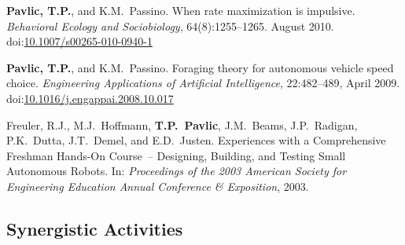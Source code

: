 \documentclass[svgnames,11pt]{article}
\newcommand\doilink[1]{\href{http://dx.doi.org/#1}{#1}}
\newcommand\doi[1]{doi:\doilink{#1}}
\begin{document}
\begin{bibenum}[itemsep=5pt]
    \item \textbf{Pavlic, T.P.}, and K.M.~Passino. When rate maximization is
        impulsive. \emph{Behavioral Ecology and Sociobiology},
        64(8):1255--1265. August 2010. \doi{10.1007/s00265-010-0940-1}

    \item \textbf{Pavlic, T.P.}, and K.M.~Passino. Foraging theory for
        autonomous vehicle speed choice. \emph{Engineering Applications
        of Artificial Intelligence}, 22:482--489, April 2009.
        \doi{10.1016/j.engappai.2008.10.017}

    \item Freuler, R.J., M.J.~Hoffmann, \textbf{T.P.~Pavlic}, J.M.~Beams,
        J.P.~Radigan, P.K.~Dutta, J.T.~Demel, and E.D.~Justen.
        Experiences with a Comprehensive Freshman Hands-On Course~--
        Designing, Building, and Testing Small Autonomous Robots. In:
        \emph{Proceedings of the 2003 American Society for Engineering
        Education Annual Conference \& Exposition}, 2003.

\end{bibenum}

\subsection{Synergistic Activities}
\end{document}

